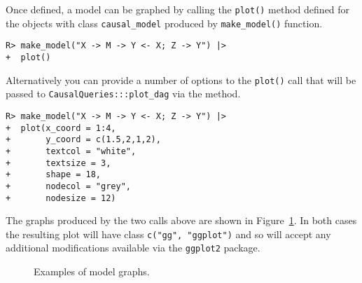 \documentclass[
  11pt,
  article]{jss}
\begin{document}
Once defined, a model can be graphed by calling the \texttt{plot()}
method defined for the objects with class \texttt{causal\_model}
produced by \texttt{make\_model()} function.

\begin{verbatim}
R> make_model("X -> M -> Y <- X; Z -> Y") |>
+  plot()
\end{verbatim}

Alternatively you can provide a number of options to the \texttt{plot()}
call that will be passed to \texttt{CausalQueries:::plot\_dag} via the
method.

\begin{verbatim}
R> make_model("X -> M -> Y <- X; Z -> Y") |>
+  plot(x_coord = 1:4,
+       y_coord = c(1.5,2,1,2),
+       textcol = "white",
+       textsize = 3,
+       shape = 18,
+       nodecol = "grey",
+       nodesize = 12)
\end{verbatim}

The graphs produced by the two calls above are shown in
Figure~\ref{fig-plots}. In both cases the resulting plot will have class
\texttt{c("gg",\ "ggplot")} and so will accept any additional
modifications available via the \texttt{ggplot2} package.

\begin{figure}

\begin{minipage}[t]{0.50\linewidth}

{\centering 


}

\end{minipage}%
%
\begin{minipage}[t]{0.50\linewidth}

{\centering 


}

\end{minipage}%

\caption{\label{fig-plots}Examples of model graphs.}

\end{figure}
\end{document}
